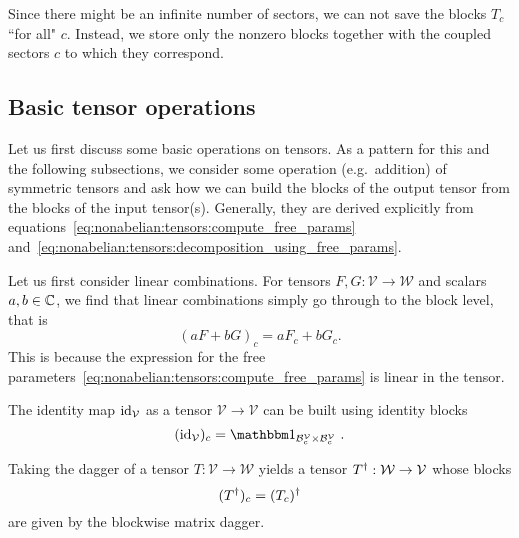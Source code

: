 Since there might be an infinite number of sectors, we can not save the blocks $T_c$ ``for all" $c$.
%
Instead, we store only the nonzero blocks together with the coupled sectors $c$ to which they correspond.

\subsection{Basic tensor operations}
\label{subsec:nonabelian:tensors:basic_operations}

Let us first discuss some basic operations on tensors.
%
As a pattern for this and the following subsections, we consider some operation (e.g.~addition) of symmetric tensors and ask how we can build the blocks of the output tensor from the blocks of the input tensor(s).
%
Generally, they are derived explicitly from equations~\eqref{eq:nonabelian:tensors:compute_free_params} and~\eqref{eq:nonabelian:tensors:decomposition_using_free_params}.

Let us first consider linear combinations.
%
For tensors $F, G: \mathcal{V} \to \mathcal{W}$ and scalars $a, b \in\mathbb{C}$, we find that linear combinations simply go through to the block level, that is
\begin{equation}
    (a F + b G)_c = a F_c + b G_c
    .
\end{equation}
%
This is because the expression for the free parameters~\eqref{eq:nonabelian:tensors:compute_free_params} is linear in the tensor.

The identity map $\mathrm{id}_{\mathcal{V}}$ as a tensor $\mathcal{V} \to \mathcal{V}$ can be built using identity blocks
\begin{equation}
    \label{nonabelian:tensors:identity_map_blockwise}
    (\id{\mathcal{V}})_c = \eye_{\blockSize{\mathcal{V}}{c} \times \blockSize{\mathcal{V}}{c}}
    ~.
\end{equation}

Taking the dagger of a tensor $T: \mathcal{V} \to \mathcal{W}$ yields a tensor $T^\dagger: \mathcal{W} \to \mathcal{V}$ whose blocks
\begin{equation}
    \label{nonabelian:tensors:dagger_blockwise}
    (T^\dagger)_c = (T_c)^\dagger
\end{equation}
are given by the blockwise matrix dagger.

